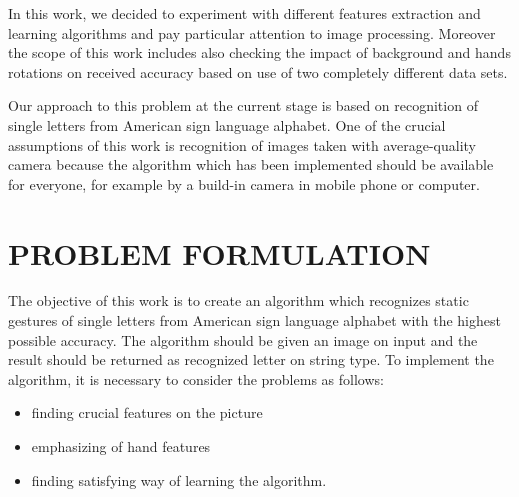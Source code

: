 \documentclass[11pt,a4paper]{article}
\begin{document}
	In this work, we decided to experiment with different features extraction and learning algorithms and pay particular attention to image processing. Moreover the scope of this work includes also checking the impact of background and hands rotations on received accuracy based on use of two completely different data sets.
	
	Our approach to this problem at the current stage is based on recognition of single letters from American sign language alphabet. One of the crucial assumptions of this work is recognition of images taken with average-quality camera because the algorithm which has been implemented should be available for everyone, for example by a build-in camera in mobile phone or computer.
	
	
	
	
	

	

\section{PROBLEM FORMULATION}

	The objective of this work is to create an algorithm which recognizes static gestures of single letters from American sign language alphabet with the highest possible accuracy. The algorithm should be given an image on input and the result should be returned as recognized letter on string type. To implement the algorithm, it is necessary to consider the problems as follows:
\begin{itemize}	
\item finding crucial features on the picture

\item emphasizing of hand features
	
\item  finding satisfying way of learning the algorithm.
\end{itemize}







\end{document}
